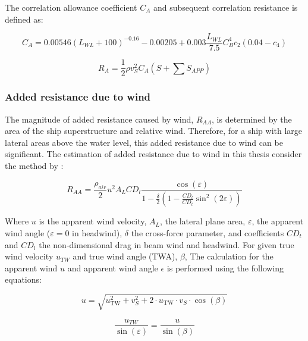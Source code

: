\pagebreak

The correlation allowance coefficient $C_A$ and subsequent correlation resistance is defined as:

\begin{equation}
    \label{eqn:Ca_correlation}
    C_A = 0.00546(L_{WL}+100)^{-0.16} - 0.00205 + 0.003\frac{L_{WL}}{7.5}C_{B}^4c_2(0.04-c_4)
\end{equation}

\begin{equation}
    \label{eqn:R_a}
    R_A = \frac{1}{2}\rho v_S^2 C_A (S+\sum S_{APP})
\end{equation}

\subsubsection{Added resistance due to wind}\label{sec:wind_resistance}

The magnitude of added resistance caused by wind, $R_{AA}$, is determined by the area of the ship superstructure and relative wind. Therefore, for a ship with large lateral areas above the water level, this added resistance due to wind can be significant. The estimation of added resistance due to wind in this thesis consider the method by :

\begin{equation}
    \label{eqn:Raa_blendermann}
    R_{AA} = \frac{\rho_{air}}{2}u^2A_{L}CD_l \frac{\cos{(\varepsilon)}}{1-\frac{\delta}{2}(1-\frac{CD_l}{CD_t}\sin^2{(2\varepsilon)})}
\end{equation}

Where $u$ is the apparent wind velocity, $A_L$, the lateral plane area, $\varepsilon$, the apparent wind angle ($\varepsilon = 0$ in headwind), $\delta$ the cross-force parameter, and coefficients $CD_t$ and $CD_l$ the non-dimensional drag in beam wind and headwind. For given true wind velocity $u_{TW}$ and true wind angle (TWA), $\beta$, The calculation for the apparent wind $u$ and apparent wind angle $\epsilon$ is performed using the following equations:

\begin{equation}
    \label{eqn:u_AW}
    u = \sqrt{u_{\text{TW}}^2 + v_S^2 + 2 \cdot u_{\text{TW}} \cdot v_S \cdot \cos(\beta)}
\end{equation}

\begin{equation}
    \label{eqn:epsilon_AWA}
    \frac{u_{TW}}{\sin(\varepsilon)} = \frac{u}{\sin({\beta})}
\end{equation}


